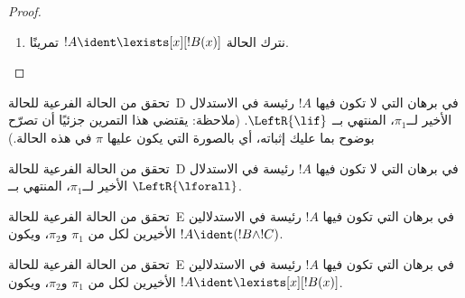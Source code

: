 \documentclass[../../../include/open-logic-section]{subfiles}
\begin{document}
\begin{proof}
\begin{enumerate}
المتتالية النهائية لــ!!{proof}~$\pi_1'$ هي $\Gamma \Sequent \Delta,
!B(c)$، حيث $c$ المتغير المميز لاستدلال~$\RightR{\lforall}$. ولذلك لا يرد
$c$ في~$!B(x)$ أو $\Gamma$ أو~$\Delta$. نفترض أن !!{proof}~$\pi$ منتظم،
ومن ثم لا يكون $c$ المتغير المميز إلا لاستدلال~$\RightR{\lforall}$ الآتي،
ولا يرد إلا فوقه، أي لا يرد إلا في~$\pi_1'$، وليس متغيرًا مميزًا لاستدلال
في~$\pi_1'$. ولما كان $c$ لا يرد في~$\pi_2$، فلا يمكن أن يرد في~$t$.
وبحسب  يكون
!!{proof}~$\Subst{\pi_1'}{t}{c}$ هو !!a{proof} لــ$\Gamma \Sequent
\Delta, !B(t)$. ونطبّق الآن فرض الاستقراء على !!{proof}
\[
\AxiomC{}
\RightLabel{$\Subst{\pi_1'}{t}{c}$}
\Deduce$\Gamma \fCenter \Delta, !B(t)$
\AxiomC{}
\RightLabel{$\pi_2''$}
\Deduce$!B(t), \Gamma \fCenter \Delta$
\RightLabel{\CutCS}
\BinaryInf$\Gamma \fCenter \Delta$
\DisplayProof
\]
(ينطبق فرض الاستقراء لأن !!{formula} القطع هي~$!B(t)$، ولذلك تكون رتبة
القطع في !!{proof} أدنى منها في~$\pi$.)
\item نترك الحالة $!A \ident \lexists[x][!B(x)]$ تمرينًا.
\end{enumerate}
\end{proof}

\begin{prob}
تحقق من الحالة الفرعية للحالة~D في برهان  التي لا
تكون فيها $!A$ رئيسة في الاستدلال الأخير لــ$\pi_1$، المنتهي بــ
$\LeftR{\lif}$. (ملاحظة: يقتضي هذا التمرين جزئيًا أن تصرّح بوضوح بما عليك
إثباته، أي بالصورة التي يكون عليها $\pi$ في هذه الحالة.)
\end{prob}

\begin{prob}
تحقق من الحالة الفرعية للحالة~D في برهان  التي لا
تكون فيها $!A$ رئيسة في الاستدلال الأخير لــ$\pi_1$، المنتهي بــ
$\LeftR{\lforall}$.
\end{prob}

\begin{prob}
تحقق من الحالة الفرعية للحالة~E في برهان  التي تكون
فيها $!A$ رئيسة في الاستدلالين الأخيرين لكل من $\pi_1$ و$\pi_2$، ويكون
$!A \ident (!B \land !C)$.
\end{prob}

\begin{prob}
تحقق من الحالة الفرعية للحالة~E في برهان  التي تكون
فيها $!A$ رئيسة في الاستدلالين الأخيرين لكل من $\pi_1$ و$\pi_2$، ويكون
$!A \ident \lexists[x][!B(x)]$.
\end{prob}
\end{document}
